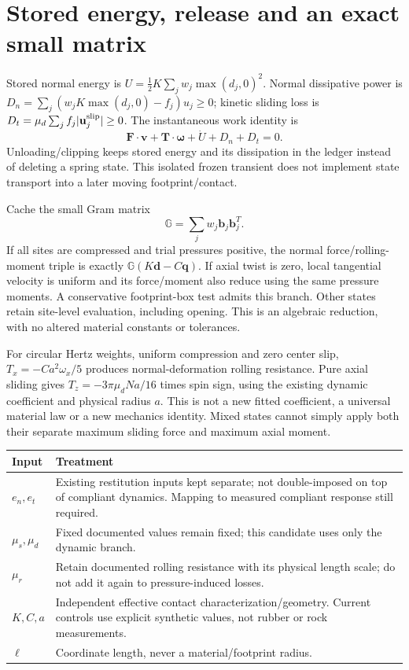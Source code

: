 \documentclass[10pt,a4paper]{article}
\newcommand{\toprule}{\hline}\newcommand{\midrule}{\hline}\newcommand{\bottomrule}{\hline}
\begin{document}
\newpage
\section*{Stored energy, release and an exact small matrix}
Stored normal energy is $U=\tfrac12K\sum_j w_j\max(d_j,0)^2$.
Normal dissipative power is $D_n=\sum_j(w_j K\max(d_j,0)-f_j)u_j\geq0$;
kinetic sliding loss is $D_t=\mu_d\sum_j f_j |\mathbf u_j^{\rm slip}|\geq0$.
The instantaneous work identity is
\[
 \mathbf F\cdot\mathbf v+\mathbf T\cdot\boldsymbol\omega+\dot U+D_n+D_t=0.
\]
Unloading/clipping keeps stored energy and its dissipation in the ledger instead
of deleting a spring state. This isolated frozen transient does not implement
state transport into a later moving footprint/contact.

Cache the small Gram matrix
\[
 \mathbb G=\sum_j w_j\mathbf b_j\mathbf b_j^T.
\]
If all sites are compressed and trial pressures positive, the normal
force/rolling-moment triple is exactly
$\mathbb G(K\mathbf d-C\mathbf q)$.
If axial twist is zero, local tangential velocity is uniform and its force/moment
also reduce using the same pressure moments. A conservative footprint-box test
admits this branch. Other states retain site-level evaluation, including opening.
This is an algebraic reduction, with no altered material constants or tolerances.

For circular Hertz weights, uniform compression and zero center slip,
$T_x=-Ca^2\omega_x/5$ produces normal-deformation rolling resistance.
Pure axial sliding gives $T_z=-3\pi\mu_dNa/16$ times spin sign, using the existing
dynamic coefficient and physical radius $a$. This is not a new fitted coefficient,
a universal material law or a new mechanics identity. Mixed states cannot simply
apply both their separate maximum sliding force and maximum axial moment.

\begin{center}\begin{tabular}{p{.2\linewidth}p{.69\linewidth}}\toprule
Input & Treatment \\\midrule
$e_n,e_t$ & Existing restitution inputs kept separate; not double-imposed on top of compliant dynamics. Mapping to measured compliant response still required.\\
$\mu_s,\mu_d$ & Fixed documented values remain fixed; this candidate uses only the dynamic branch.\\
$\mu_r$ & Retain documented rolling resistance with its physical length scale; do not add it again to pressure-induced losses.\\
$K,C,a$ & Independent effective contact characterization/geometry. Current controls use explicit synthetic values, not rubber or rock measurements.\\
$\ell$ & Coordinate length, never a material/footprint radius.\\\bottomrule
\end{tabular}\end{center}
\end{document}
